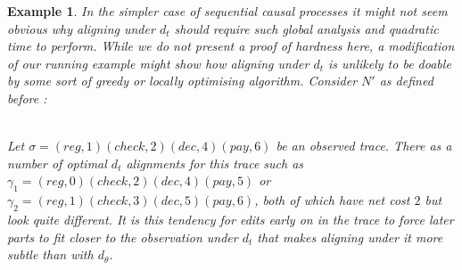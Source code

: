 \documentclass[conference]{IEEEtran}
\newtheorem{example}{Example}
\begin{document}
			
		\begin{example}\label{altdthard}
			In the simpler case of sequential causal processes it might not seem obvious why aligning under $d_t$ should require such global analysis and quadratic time to perform. 
			While we do not present a proof of hardness here, a modification of our running example might show how aligning under $d_t$ is unlikely to be doable by some sort of greedy or locally optimising algorithm. 
			Consider $N'$ as defined before :  
						
				\\
				
				Let $\sigma = (reg, 1)(check, 2)(dec, 4)(pay,6)$ be an observed trace.
				There as a number of optimal $d_t$ alignments for this trace such as $\gamma_1 = (reg, 0)(check, 2)(dec, 4)(pay,5)$ or 	$\gamma_2 = (reg, 1)(check, 3)(dec, 5)(pay,6)$, both of which have net cost $2$ but look quite different. 
				It is this tendency for edits early on in the trace to force later parts to fit closer to the observation under $d_t$ that makes aligning under it more subtle than with $d_{\theta}$.  		
	
			\end{example}
\end{document}
